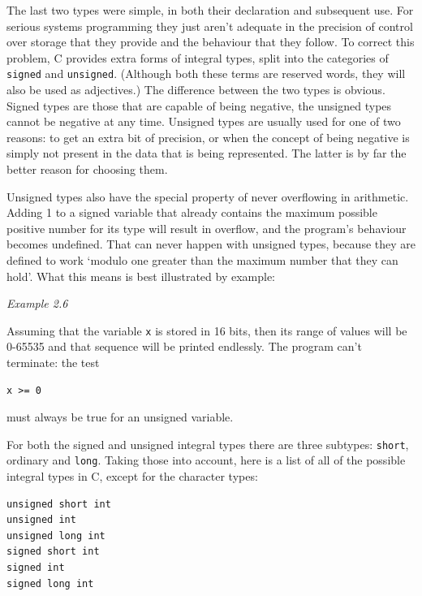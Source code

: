    The last two types were simple, in both their declaration and subsequent
    use. For serious systems programming they just aren't adequate in the
    precision of control over storage that they provide and the behaviour that
    they follow. To correct this problem, C provides extra forms of
    integral types, split into the categories of \texttt{signed} and
    \texttt{unsigned}. (Although both these terms are reserved words, they
    will also be used as adjectives.) The difference between the two types is
    obvious. Signed types are those that are capable of being negative, the
    unsigned types cannot be negative at any time. Unsigned types are usually
    used for one of two reasons: to get an extra bit of precision, or when the
    concept of being negative is simply not present in the data that is being
    represented. The latter is by far the better reason for choosing them.


   Unsigned types also have the special property of never overflowing in
    arithmetic. Adding 1 to a signed variable that already contains the
    maximum possible positive number for its type will result in overflow, and
    the program's behaviour becomes undefined. That can never happen with
    unsigned types, because they are defined to work `modulo one greater
    than the maximum number that they can hold'. What this means is best
    illustrated by example:


   \begin{center}\textit{Example 2.6}\end{center}


   Assuming that the variable \texttt{x} is stored in
    16 bits, then its range of values will be 0-65535 and that
    sequence will be printed endlessly. The program can't terminate: the
    test


   \begin{Verbatim}
x >= 0
\end{Verbatim}

   must always be true for an unsigned variable.


   For both the signed and unsigned integral types there are three
    subtypes: \texttt{short}, ordinary and \texttt{long}. Taking those
    into account, here is a list of all of the possible integral types
    in C, except for the character types:


   \begin{Verbatim}
unsigned short int
unsigned int
unsigned long int
signed short int
signed int
signed long int
\end{Verbatim}

